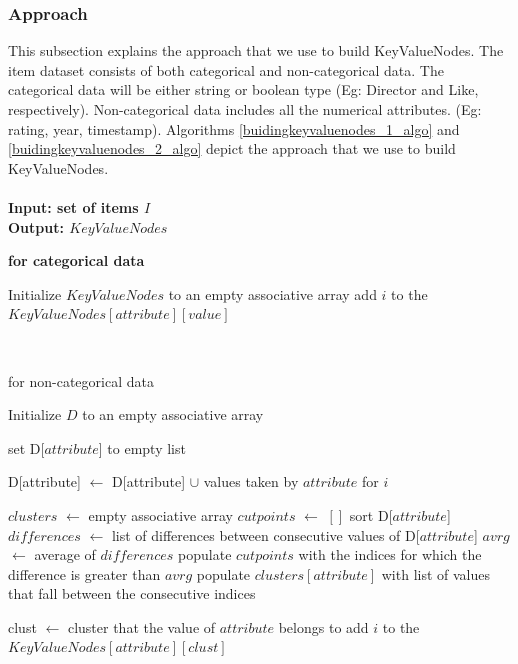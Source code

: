 \documentclass[11pt]{article}
\begin{document}
\subsubsection{Approach}
This subsection explains the approach that we use to build KeyValueNodes. The item dataset consists of both categorical and non-categorical data. The categorical data will be either string or boolean type (Eg: Director and Like, respectively). Non-categorical data includes all the numerical attributes. (Eg: rating, year, timestamp). Algorithms \ref{buidingkeyvaluenodes_1_algo} and \ref{buidingkeyvaluenodes_2_algo} depict the approach that we use to build KeyValueNodes.
\\
\\
\bf{Input:} set of items $I$ \\
\bf{Output:} $KeyValueNodes$
\begin{algorithm}
\label{buidingkeyvaluenodes_1_algo}
\caption{\bf for categorical data}
\begin{algorithmic}[1]
\STATE Initialize $KeyValueNodes$ to an empty associative array
\STATE add $i$ to the $KeyValueNodes[attribute][value]$

\ENDFOR
\ENDFOR
\ENDFOR
\end{algorithmic}
\end{algorithm}
\\
\begin{algorithm}
\label{buidingkeyvaluenodes_2_algo}
\caption{for non-categorical data}
\begin{algorithmic}[1]
\STATE Initialize $D$ to an empty associative array

  \STATE set D[$attribute$] to empty list
\ENDFOR

       \STATE D[attribute] $\leftarrow$ D[attribute] $\cup$ values taken by $attribute$ for $i$
    \ENDFOR
\ENDFOR

\STATE $clusters$ $\leftarrow$ empty associative array
  \STATE $cutpoints$ $\leftarrow$ $[]$
  \STATE sort D[$attribute$]
  \STATE $differences$ $\leftarrow$ list of differences between consecutive values of D[$attribute$]
  \STATE $avrg$ $\leftarrow$ average of $differences$
  \STATE populate $cutpoints$ with the indices for which the difference is greater than $avrg$
  \STATE populate $clusters[attribute]$ with list of values that fall between the consecutive indices
\ENDFOR

    \STATE clust $\leftarrow$ cluster that the value of $attribute$ belongs to
    \STATE add $i$ to the $KeyValueNodes[attribute][clust]$
  \ENDFOR
\ENDFOR
\end{algorithmic}
\end{algorithm}
\end{document}
